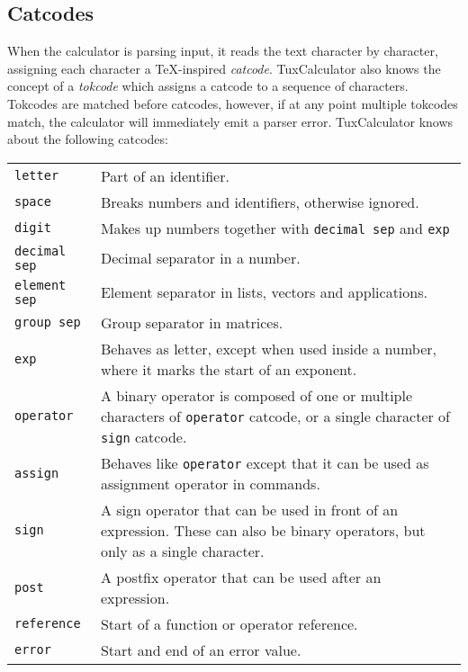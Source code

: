 \documentclass[10pt]{article}
\begin{document}
    \subsection{Catcodes}\label{subsec:catcodes}
    When the calculator is parsing input, it reads the text character by character, assigning each character a \TeX-inspired \textit{catcode}.
    TuxCalculator also knows the concept of a \textit{tokcode} which assigns a catcode to a sequence of characters.
    Tokcodes are matched before catcodes, however, if at any point multiple tokcodes match, the calculator will immediately emit a parser error.
    TuxCalculator knows about the following catcodes:
    \begin{longtable}{p{}p{}}
        \verb|letter|          & Part of an identifier. \\
        \verb|space|           & Breaks numbers and identifiers, otherwise ignored. \\
        \verb|digit|           & Makes up numbers together with \verb|decimal sep| and \verb|exp| \\
        \verb|decimal sep|     & Decimal separator in a number. \\
        \verb|element sep|     & Element separator in lists, vectors and applications. \\
        \verb|group sep|       & Group separator in matrices. \\
        \verb|exp|             & Behaves as letter, except when used inside a number, where it marks the start of an exponent. \\
        \verb|operator|        & A binary operator is composed of one or multiple characters of \verb|operator| catcode, or a single character of \verb|sign| catcode. \\
        \verb|assign|          & Behaves like \verb|operator| except that it can be used as assignment operator in commands. \\
        \verb|sign|            & A sign operator that can be used in front of an expression. These can also be binary operators, but only as a single character. \\
        \verb|post|            & A postfix operator that can be used after an expression. \\
        \verb|reference|       & Start of a function or operator reference. \\
        \verb|error|           & Start and end of an error value. \\

\end{longtable}
\end{document}

